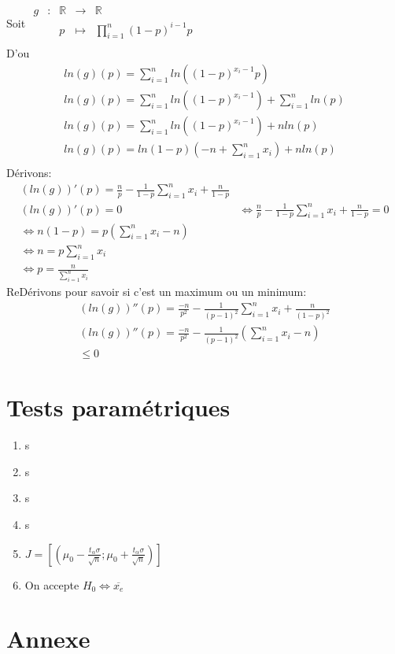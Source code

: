 \documentclass[12pt]{report}
\newcommand{\R}{\mathbb{R}}
\newcommand{\fct}[5]
	{
	  \begin{array}{ccccc}
		#1 & : & #2 & \to & #3 \\
	    && #4 & \mapsto & #5 \\
	  \end{array}
	}
\begin{document}
Soit $\fct{g}{\R}{\R}{p}{\prod_{i=1}^n (1-p)^{i-1}p}$\\
D'ou 
\begin{align*}
    ln(g)(p) = \sum_{i=1}^n ln((1-p)^{x_i-1}p)\\
    ln(g)(p) = \sum_{i=1}^n ln((1-p)^{x_i-1}) + \sum_{i=1}^n ln(p)\\
    ln(g)(p) = \sum_{i=1}^{n} ln((1-p)^{x_i-1}) + nln(p)\\
    ln(g)(p) = ln(1-p)(-n + \sum_{i=1}^{n} x_i)  + nln(p)\\
\end{align*}
Dérivons:
\begin{align*}
    (ln(g))'(p) = \frac{n}{p} - \frac{1}{1-p}\sum_{i=1}^{n} x_i + \frac{n}{1-p}\\
    (ln(g))'(p) = 0 &\Leftrightarrow \frac{n}{p} - \frac{1}{1-p}\sum_{i=1}^{n} x_i + \frac{n}{1-p} =0\\
    \Leftrightarrow n(1-p) = p (\sum_{i=1}^{n} x_i  - n)\\
    \Leftrightarrow n = p \sum_{i=1}^n x_i\\
    \Leftrightarrow p = \frac{n}{\sum_{i=1}^n x_i}
\end{align*}
ReDérivons pour savoir si c'est un maximum ou un minimum:\\
\begin{align*}
    (ln(g))''(p) = \frac{-n}{p^2} - \frac{1}{(p-1)^2}\sum_{i=1}^n x_i  + \frac{n}{(1-p)^2}\\
    (ln(g))''(p) = \frac{-n}{p^2} - \frac{1}{(p-1)^2}(\sum_{i=1}^n x_i   -n)\\
    \leq 0
\end{align*}

\chapter*{Tests paramétriques}

\begin{enumerate}
    \item s
    \item s
    \item s
    \item s
    \item  $J = [(\mu_0 - \frac{t_\alpha \sigma}{\sqrt{n}};\mu_0 + \frac{t_\alpha \sigma}{\sqrt{n}})]$
    \item On accepte $H_0 \Leftrightarrow \overline{x_e}$
\end{enumerate}
\chapter*{Annexe}
\end{document}
